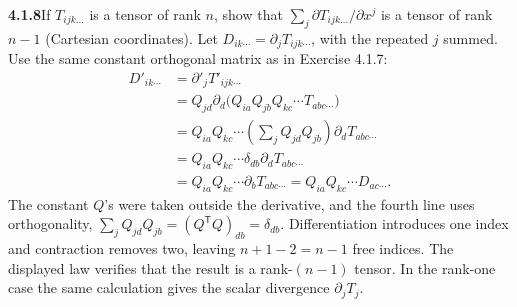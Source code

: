 \par\bigskip
\noindent\textbf{4.1.8}\quad If $T_{ijk\ldots}$ is a tensor of rank $n$, show
that $\sum_{j}\partial T_{ijk\ldots}/\partial x^{j}$ is a tensor of rank
$n-1$ (Cartesian coordinates).
\solution
Let $D_{ik\cdots}=\partial_jT_{ijk\cdots}$, with the repeated
$j$ summed. Use the same constant orthogonal matrix as in Exercise 4.1.7:
\begin{align*}
D'_{ik\cdots}
&=\partial'_jT'_{ijk\cdots}\\
&=Q_{jd}\partial_d
  \bigl(Q_{ia}Q_{jb}Q_{kc}\cdots T_{abc\cdots}\bigr)\\
&=Q_{ia}Q_{kc}\cdots
  \left(\sum_jQ_{jd}Q_{jb}\right)\partial_dT_{abc\cdots}\\
&=Q_{ia}Q_{kc}\cdots\delta_{db}\partial_dT_{abc\cdots}\\
&=Q_{ia}Q_{kc}\cdots\partial_bT_{abc\cdots}
 =Q_{ia}Q_{kc}\cdots D_{ac\cdots}.
\end{align*}
The constant $Q$'s were taken outside the derivative, and the fourth line
uses orthogonality,
$\sum_jQ_{jd}Q_{jb}=(Q^{\mathsf T}Q)_{db}=\delta_{db}$.
Differentiation introduces one index and contraction removes two, leaving
$n+1-2=n-1$ free indices. The displayed law verifies that the result is a
rank-$(n-1)$ tensor. In the rank-one case the same calculation gives the
scalar divergence $\partial_jT_j$.

